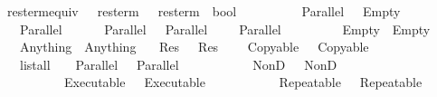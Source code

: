 \ res{\isacharunderscore}term{\isacharunderscore}equiv\ {\isacharcolon}{\isacharcolon}\ {\isachardoublequoteopen}\ res{\isacharunderscore}term\ {\isasymRightarrow}\ \ res{\isacharunderscore}term\ {\isasymRightarrow}\ bool{\isachardoublequoteclose}\ {\isacharparenleft}\ {\isachardoublequoteopen}{\isasymsim}{\isachardoublequoteclose}\ {}{}{}{\isacharparenright}\isanewline
\ \ \isanewline
\ \ \ \ {\isachardoublequoteopen}Parallel\ {\isacharbrackleft}{\isacharbrackright}\ \isafv{\isasymsim}\ Empty{\isachardoublequoteclose}\isanewline
\ \ {\isacharbar}\ {\isachardoublequoteopen}Parallel\ {\isacharbrackleft}\ \isafv{\isasymsim}\ \isanewline
\ \ {\isacharbar}\ {\isachardoublequoteopen}Parallel\ {\isacharparenleft}\ {\isacharat}\ {\isacharbrackleft}Parallel\ \ {\isacharat}\ \ \isafv{\isasymsim}\ Parallel\ {\isacharparenleft}\ {\isacharat}\ \ {\isacharat}\ \ \isanewline
\ \ {\isacharbar}\ {\isachardoublequoteopen}Empty\ \isafv{\isasymsim}\ Empty{\isachardoublequoteclose}\isanewline
\ \ {\isacharbar}\ {\isachardoublequoteopen}Anything\ \isafv{\isasymsim}\ Anything{\isachardoublequoteclose}\isanewline
\ \ {\isacharbar}\ {\isachardoublequoteopen}Res\ \ \isafv{\isasymsim}\ Res\ \isanewline
\ \ {\isacharbar}\ {\isachardoublequoteopen}Copyable\ \ \isafv{\isasymsim}\ Copyable\ \isanewline
\ \ {\isacharbar}\ {\isachardoublequoteopen}list{\isacharunderscore}all{}\ {\isacharparenleft}\isafv{\isasymsim}{\isacharparenright}\ \ {\isasymLongrightarrow}\ Parallel\ \ \isafv{\isasymsim}\ Parallel\ \isanewline
\ \ {\isacharbar}\ {\isachardoublequoteopen}{\isasymlbrakk}\ \isafv{\isasymsim}\ \ \ \isafv{\isasymsim}\ \ {\isasymLongrightarrow}\ NonD\ \ \isafv{\isasymsim}\ NonD\ \isanewline
\ \ {\isacharbar}\ {\isachardoublequoteopen}{\isasymlbrakk}\ \isafv{\isasymsim}\ \ \ \isafv{\isasymsim}\ \ {\isasymLongrightarrow}\ Executable\ \ {\isasymsim}\ Executable\ \isanewline
\ \ {\isacharbar}\ {\isachardoublequoteopen}{\isasymlbrakk}\ \isafv{\isasymsim}\ \ \ \isafv{\isasymsim}\ \ {\isasymLongrightarrow}\ Repeatable\ \ {\isasymsim}\ Repeatable\ \isanewline
\ \ {\isacharbar}\ {\isachardoublequoteopen}\ \isafv{\isasymsim}\ \ {\isasymLongrightarrow}\ \ \isafv{\isasymsim}\ \isanewline
\ \ {\isacharbar}\ {\isachardoublequoteopen}{\isasymlbrakk}\ \isafv{\isasymsim}\ \ \ \isafv{\isasymsim}\ \ {\isasymLongrightarrow}\ \ \isafv{\isasymsim}\ 
